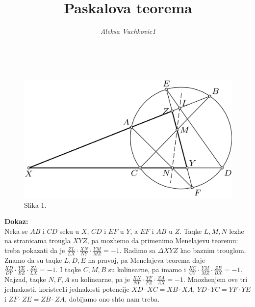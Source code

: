 \documentclass[11pt,letter]{article}
\title{\huge \textbf{Paskalova teorema}}
\author{\textit{Aleksa Vuchkovic1}}
\date{}
\newcommand{\D}{\displaystyle}
\begin{document}
\maketitle
\large
{}\\
\par
\begin{figure}
\centering
\includegraphics[scale=0.235]{Paskal}
\caption*{Slika 1.}
\end{figure}
\vspace{0.5cm}
\textbf{Dokaz:}
\vspace{0.5cm}
\\Neka se $AB$ i $CD$ seku u $X$, $CD$ i $EF$ u $Y$, a $EF$ i $AB$ u $Z$. Taqke $L, M, N$ lezhe na \text stranicama trougla $XYZ$, pa mozhemo da primenimo Menelajevu teoremu: treba pokazati da je $\D\frac{ZL}{LX}\cdot\frac{XN}{NY}\cdot\frac{YM}{MZ}=-1$. Radimo sa $\Delta XYZ$ kao baznim trouglom. Znamo da su taqke $L, D, E$ na pravoj, pa Menelajeva teorema daje $\D\frac{XD}{DY}\cdot\frac{YE}{EZ}\cdot\frac{ZL}{LX}=-1$. I taqke $C, M, B$ su \text kolinearne, pa imamo i $\D\frac{XC}{CY}\cdot\frac{YM}{MZ}\cdot\frac{ZB}{BX}=-1$. Najzad, taqke $N, F, A$ su kolinearne, pa je $\D\frac{XN}{NY}\cdot\frac{YF}{FZ}\cdot\frac{ZA}{AX}=-1$. Mnozhenjem ove tri jednakosti, koristec1i jednakosti potencije $XD\cdot XC = XB\cdot XA$, $YD\cdot YC = YF\cdot YE$ i $ZF\cdot ZE = ZB\cdot ZA$, dobijamo ono shto nam treba.\\
\end{document}
